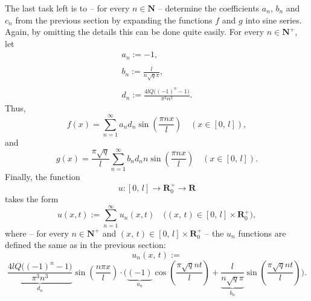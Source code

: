 \documentclass[12pt]{article}
\begin{document}
The last task left is to -- for every $n \in \mathbf{N}$ -- determine the coefficients $a_n$, $b_n$ and $c_n$ from the previous section by expanding the functions $f$ and $g$ into sine series. Again, by omitting the details this can be done quite easily. For every $n \in \mathbf{N}^+$, let
$$
\begin{array}{ll}
	a_n := -1,\\
	\\
	b_n := \displaystyle \frac{l}{n \sqrt{q} \pi},\\
	\\
	d_n := \displaystyle \frac{4l Q\big( (-1)^n - 1 \big)}{\pi^3n^3}.
\end{array}
$$
Thus,
$$
f(x) = \sum_{n=1}^\infty a_n d_n \sin\left(\frac{\pi n x}{l}\right) \quad (x \in [0, \, l]),
$$
and
$$
g(x) = \frac{\pi \sqrt{q}}{l} \sum_{n=1}^\infty b_n d_n n \sin\left(\frac{\pi n x}{l}\right) \quad (x \in [0, \, l]).
$$
Finally, the function
$$
u : [0, \, l] \to \mathbf{R}^+_0 \to \mathbf{R}
$$
takes the form
$$
u(x, t) := \sum_{n=1}^\infty u_n(x, t) \quad \big((x, \, t) \in [0, \, l] \times \mathbf{R}_0^+ \big),
$$
where -- for every $n \in \mathbf{N}^+$ and $(x, \, t) \in [0, \, l] \times \mathbf{R}_0^+$ -- the $u_n$ functions are defined the same as in the previous section:
$$
	u_n(x, \, t) :=
$$
$$
 \underbrace{\frac{4l Q\big( (-1)^n - 1 \big)}{\pi^3n^3}}_{d_n} \sin\left(\frac{n \pi x}{l}\right) \cdot \Bigg(\underbrace{(-1)}_{a_n}\cos\left(\frac{\pi \sqrt{q} n t}{l}\right) + \underbrace{\frac{l}{n \sqrt{q} \pi}}_{b_n} \sin\left(\frac{\pi \sqrt{q} n t}{l}\right)\Bigg).
$$
\end{document}
